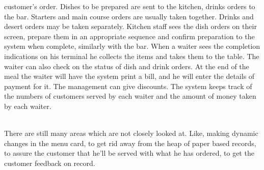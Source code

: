 \documentclass[12pt,a4paper]{report}
\begin{document}
customer’s order. Dishes to be prepared are sent to the kitchen,
drinks orders to the bar. Starters and main course orders are
usually taken together. Drinks and desert orders may be taken
separately. Kitchen staff sees the dish orders on their screen,
prepare them in an appropriate sequence and confirm preparation
to the system when complete, similarly with the bar. When a
waiter sees the completion indications on his terminal he collects
the items and takes them to the table. The waiter can also check
on the status of dish and drink orders. At the end of the meal the
waiter will have the system print a bill, and he will enter the
details of payment for it. The management can give discounts.
The system keeps track of the numbers of customers served by
each waiter and the amount of money taken by each waiter.
\\
\\
\par
There are still many areas which are not closely
looked at. Like, making dynamic changes in the menu card, to
get rid away from the heap of paper based records, to assure the
customer that he’ll be served with what he has ordered, to get the
customer feedback on record.
\end{document}
